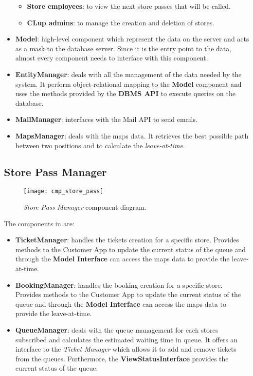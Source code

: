 \begin{itemize}
\begin{itemize}
		\item \textbf{Store employees}: to view the next store passes that will be called.
		\item \textbf{CLup admins}: to manage the creation and deletion of stores.
	\end{itemize}
	
	\item \textbf{Model}: high-level component which represent the data on the server and acts as a mask to the database server. Since it is the entry point to the data, almost every component needs to interface with this component.
	
	\item \textbf{EntityManager}: deals with all the management of the data needed by the system. It perform object-relational mapping to the \textbf{Model} component and uses the methods provided by the \textbf{DBMS API} to execute queries on the database.
	
	\item \textbf{MailManager}: interfaces with the Mail API to send emails.	
	
	\item \textbf{MapsManager}: deals with the maps data. It retrieves the best possible path between two positions and to calculate the \textit{leave-at-time}.
\end{itemize}

\clearpage

\subsection{Store Pass Manager}

\begin{figure}[H]
	\centering
	\texttt{[image: cmp\_store\_pass]}
	\caption{\textit{Store Pass Manager} component diagram.}
	\label{fig:cmp_store_pass}
\end{figure}

The components in  are:
\begin{itemize}
	\item \textbf{TicketManager}: handles the tickets creation for a specific store. Provides methods to the Customer App to update the current status of the queue and through the \textbf{Model Interface} can access the maps data to provide the leave-at-time.
	
	\item \textbf{BookingManager}: handles the booking creation for a specific store. Provides methods to the Customer App to update the current status of the queue and through the \textbf{Model Interface} can access the maps data to provide the leave-at-time.
	
	\item \textbf{QueueManager}: deals with the queue management for each stores subscribed and calculates the estimated waiting time in queue. It offers an interface to the \textit{Ticket Manager} which allows it to add and remove tickets from the queues. Furthermore, the \textbf{ViewStatusInterface} provides the current status of the queue.
\end{itemize}


